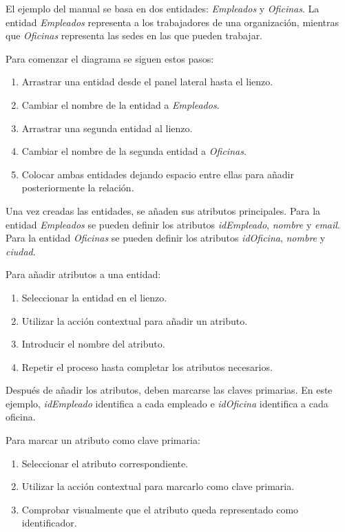 El ejemplo del manual se basa en dos entidades: \textit{Empleados} y \textit{Oficinas}. La entidad \textit{Empleados} representa a los trabajadores de una organización, mientras que \textit{Oficinas} representa las sedes en las que pueden trabajar.

Para comenzar el diagrama se siguen estos pasos:

\begin{enumerate}
    \item Arrastrar una entidad desde el panel lateral hasta el lienzo.
    \item Cambiar el nombre de la entidad a \textit{Empleados}.
    \item Arrastrar una segunda entidad al lienzo.
    \item Cambiar el nombre de la segunda entidad a \textit{Oficinas}.
    \item Colocar ambas entidades dejando espacio entre ellas para añadir posteriormente la relación.
\end{enumerate}

Una vez creadas las entidades, se añaden sus atributos principales. Para la entidad \textit{Empleados} se pueden definir los atributos \textit{idEmpleado}, \textit{nombre} y \textit{email}. Para la entidad \textit{Oficinas} se pueden definir los atributos \textit{idOficina}, \textit{nombre} y \textit{ciudad}.

Para añadir atributos a una entidad:

\begin{enumerate}
    \item Seleccionar la entidad en el lienzo.
    \item Utilizar la acción contextual para añadir un atributo.
    \item Introducir el nombre del atributo.
    \item Repetir el proceso hasta completar los atributos necesarios.
\end{enumerate}

Después de añadir los atributos, deben marcarse las claves primarias. En este ejemplo, \textit{idEmpleado} identifica a cada empleado e \textit{idOficina} identifica a cada oficina.

Para marcar un atributo como clave primaria:

\begin{enumerate}
    \item Seleccionar el atributo correspondiente.
    \item Utilizar la acción contextual para marcarlo como clave primaria.
    \item Comprobar visualmente que el atributo queda representado como identificador.
\end{enumerate}

